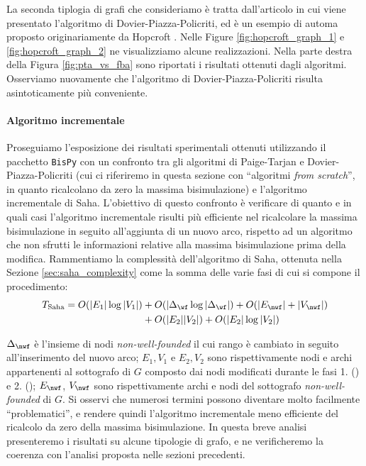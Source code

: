 La seconda tiplogia di grafi che consideriamo è tratta dall'articolo in cui viene presentato l'algoritmo di Dovier-Piazza-Policriti, ed è un esempio di automa proposto originariamente da Hopcroft \cite{hopcroft}. Nelle Figure \ref{fig:hopcroft_graph_1} e \ref{fig:hopcroft_graph_2} ne visualizziamo alcune realizzazioni. Nella parte destra della Figura \ref{fig:pta_vs_fba} sono riportati i risultati ottenuti dagli algoritmi. Osserviamo nuovamente che l'algoritmo di Dovier-Piazza-Policriti risulta asintoticamente più conveniente.

\paragraph{Algoritmo incrementale} Proseguiamo l'esposizione dei risultati sperimentali ottenuti utilizzando il pacchetto \texttt{BisPy} con un confronto tra gli algoritmi di Paige-Tarjan e Dovier-Piazza-Policriti (cui ci riferiremo in questa sezione con ``algoritmi \emph{from scratch}'', in quanto ricalcolano da zero la massima bisimulazione) e l'algoritmo incrementale di Saha. L'obiettivo di questo confronto è verificare di quanto e in quali casi l'algoritmo incrementale risulti più efficiente nel ricalcolare la massima bisimulazione in seguito all'aggiunta di un nuovo arco, rispetto ad un algoritmo che non sfrutti le informazioni relative alla massima bisimulazione prima della modifica. Rammentiamo la complessità dell'algoritmo di Saha, ottenuta nella Sezione \ref{sec:saha_complexity} come la somma delle varie fasi di cui si compone il procedimento:
\begin{align}\label{eq:saha}
    T_{\text{Saha}} = O(|E_1|\log|V_1|) &+ O(|\Delta_{\wf}\log|\Delta_{\wf}|) + O(|E_{\nwf}| + |V_{\nwf}|)\\
    &+ O(|E_2||V_2|) + O(|E_2|\log|V_2|)
\end{align}

$\Delta_\nwf$ è l'insieme di nodi \emph{non-well-founded} il cui rango è cambiato in seguito all'inserimento del nuovo arco; $E_1,V_1$ e $E_2,V_2$ sono rispettivamente nodi e archi appartenenti al sottografo di $G$ composto dai nodi modificati durante le fasi 1. () e 2. (); $E_{\nwf}$, $V_{\nwf}$ sono rispettivamente archi e nodi del sottografo \emph{non-well-founded} di $G$. Si osservi che numerosi termini possono diventare molto facilmente ``problematici'', e rendere quindi l'algoritmo incrementale meno efficiente del ricalcolo da zero della massima bisimulazione. In questa breve analisi presenteremo i risultati su alcune tipologie di grafo, e ne verificheremo la coerenza con l'analisi proposta nelle sezioni precedenti.

